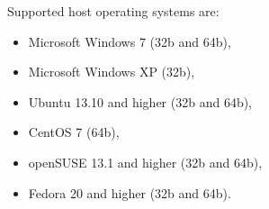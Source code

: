     Supported host operating systems are:
    \begin{itemize}
        \item Microsoft Windows 7 (32b and 64b),
        \item Microsoft Windows XP (32b),
        \item Ubuntu 13.10 and higher (32b and 64b),
        \item CentOS 7 (64b),
        \item openSUSE 13.1 and higher (32b and 64b),
        \item Fedora 20 and higher (32b and 64b).
    \end{itemize}
